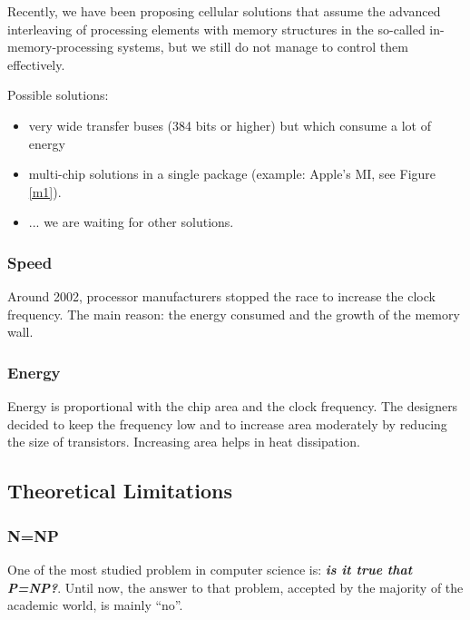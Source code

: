 Recently, we have been proposing cellular solutions that assume the advanced interleaving of processing elements with memory structures in the so-called in-memory-processing systems, but we still do not manage to control them effectively.


Possible solutions:
\begin{itemize}
\item very wide transfer buses (384 bits or higher) but which consume a lot of energy
\item multi-chip solutions in a single package (example: Apple's MI, see Figure \ref{m1}).
\item ... we are waiting for other solutions.
\end{itemize}



\subsubsection{Speed}

Around 2002, processor manufacturers stopped the race to increase the clock frequency. The main reason: the energy consumed and the growth of the memory wall.

\subsubsection{Energy}

Energy is proportional with the chip area and the clock frequency. The designers decided to keep the frequency low and to increase area moderately by reducing the size of transistors. Increasing area helps in heat dissipation.

\subsection{Theoretical Limitations}

\subsubsection{N=NP}


One of the most studied problem in computer science is: {\bf {\em is it true that P=NP?}}. Until now, the answer to that problem, accepted by the majority of the academic world, is mainly “no”.

